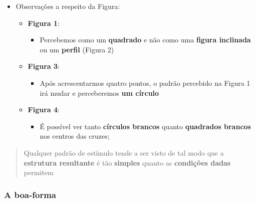 \documentclass[
]{book}
\providecommand{\tightlist}{%
  \setlength{\itemsep}{0pt}\setlength{\parskip}{0pt}}
\begin{document}
\begin{itemize}
\tightlist
\item
  Observações a respeito da Figura:

  \begin{itemize}
  \tightlist
  \item
    \textbf{Figura 1}:

    \begin{itemize}
    \tightlist
    \item
      Percebemos como um \textbf{quadrado} e não como uma \textbf{figura
      inclinada} ou um \textbf{perfil} (Figura 2)
    \end{itemize}
  \item
    \textbf{Figura 3}:

    \begin{itemize}
    \tightlist
    \item
      Após acrescentarmos quatro pontos, o padrão percebido na Figura 1
      irá mudar e perceberemos \textbf{um círculo}
    \end{itemize}
  \item
    \textbf{Figura 4}:

    \begin{itemize}
    \tightlist
    \item
      É possível ver tanto \textbf{círculos brancos} quanto
      \textbf{quadrados brancos} nos centros das cruzes;
    \end{itemize}
  \end{itemize}
\end{itemize}

\begin{quote}
Qualquer padrão de estímulo tende a ser visto de tal modo que a
\textbf{estrutura resultante} é tão \textbf{simples} quanto as
\textbf{condições dadas} permitem
\end{quote}

\hypertarget{a-boa-forma}{%
\subsubsection{A boa-forma}\label{a-boa-forma}}
\end{document}

